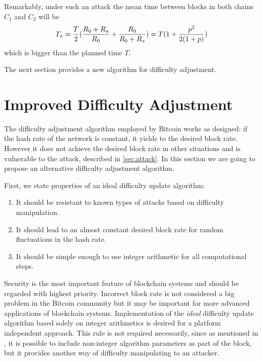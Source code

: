 \documentclass[]{llncs}
\newcommand{\coinA}{$C_1$}
\newcommand{\coinB}{$C_2$}
\begin{document}

Remarkably, under such an attack the mean time between blocks in both chains \coinA{} and \coinB{} will be
\begin{equation}
\label{eq:ati}
{T_a={T\over 2}({R_0+R_a\over R_0} + {R_0 \over R_0+R_a}) = T(1 + {p^2\over 2(1+p)})}
\end{equation}
which is bigger than the planned time $T$.


The next section provides a new algorithm for difficulty adjustment.

\section{Improved Difficulty Adjustment}
\label{sec:improved}

The difficulty adjustment algorithm employed by Bitcoin works as designed: if the hash rate of the network is constant, it yields to the desired block rate. However it does not achieve the desired block rate in other situations and is vulnerable to the attack, described in \ref{sec:attack}.
In this section we are going to propose an alternative difficulty adjustment algorithm.

First, we state properties of an ideal difficulty update algorithm:
\begin{enumerate}
\item{It should be resistant to known types of attacks based on difficulty manipulation.}
\item{It should lead to an almost constant desired block rate for random fluctuations in the hash rate.}
\item{It should be simple enough to use integer arithmetic for all computational steps.}
\end{enumerate}

Security is the most important feature of blockchain systems and should be regarded with highest priority.
Incorrect block rate is not considered a big problem in the Bitcoin community but it may be important for more advanced applications of blockchain systems.
Implementation of the \textit{ideal} difficulty update algorithm based solely on integer arithmetics is desired for a platform independent approach.
This rule is not required necessarily, since as mentioned in \cite{kraft2015difficulty}, it is possible to include non-integer algorithm parameters as part of the block, but it provides another way of difficulty manipulating to an attacker.
\end{document}
